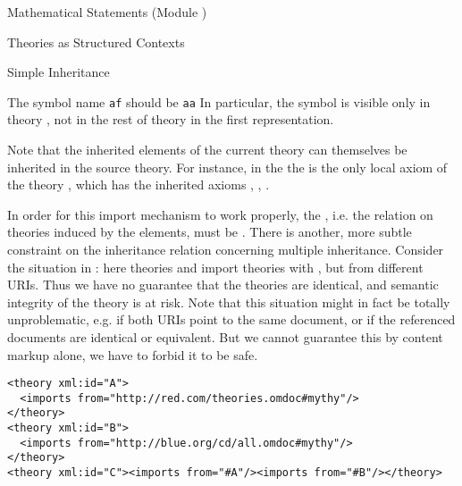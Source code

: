 \begin{tchapter}[id=statements,short=Mathematical Statements]{Mathematical Statements (Module {})}
\begin{tsection}[id=theories]{Theories as Structured Contexts}
\begin{tsubsection}[id=inheritance]{Simple Inheritance}
\begin{erratum}[reported-by=Alberto Gonzales Palomo,date=2006-10-06]{The symbol name {\texttt{af}}
  should be {\texttt{aa}}}
In particular, the symbol {} is visible only in theory {}, not
in the rest of theory {} in the first representation.
\end{erratum}
Note that the inherited elements of the current theory can themselves be inherited in the
source theory. For instance, in the {} the {} is the
only local axiom of the theory {}, which has the inherited axioms
{}, {}, {}.

In order for this import mechanism to work properly, the
{}, i.e.  the relation on theories induced by the
{} elements, must be {}. There is another, more subtle
constraint on the inheritance relation concerning multiple inheritance.  Consider the
situation in {}: here theories {} and
{} import theories with {}, but from different
URIs. Thus we have no guarantee that the theories are identical, and semantic integrity of
the theory {} is at risk. Note that this situation might in fact be totally
unproblematic, e.g. if both URIs point to the same document, or if the referenced
documents are identical or equivalent. But we cannot guarantee this by content markup
alone, we have to forbid it to be safe.

\begin{lstlisting}[label=lst:multiple-inheritance,
  caption={Problematic Multiple Inheritance},
  index={theory,symbol,axiom,imports}]
<theory xml:id="A">
  <imports from="http://red.com/theories.omdoc#mythy"/>
</theory>
<theory xml:id="B">
  <imports from="http://blue.org/cd/all.omdoc#mythy"/>
</theory>
<theory xml:id="C"><imports from="#A"/><imports from="#B"/></theory>
\end{lstlisting}


\end{tsubsection}
\end{tsection}
\end{tchapter}
